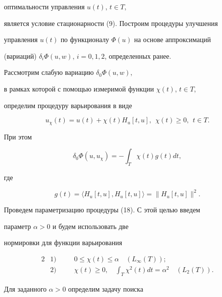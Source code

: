 оптимальности управления $u(t)$, $t\in T$,


является условие стационарности (9). Построим процедуры улучшения


управления $u(t)$ по функционалу $\Phi(u)$ на основе аппроксимаций


(вариаций) $\delta_{i}\Phi(u,w)$, $i=0, 1,2$, определенных ранее.





Рассмотрим слабую вариацию $\delta_{0}\Phi(u,w)$, 


в рамках которой с помощью измеримой функции $\chi(t)$, $t\in T$,


определим процедуру варьирования в виде


\begin{equation}


u_{\chi}(t)=u(t)+\chi(t)H_{u}[t, u],


\ \ \chi(t)\geq 0,\ \ t\in T.


\end{equation}


При этом


$$


\delta_{0}\Phi(u,u_{\chi})=- \int_{T}


\chi(t)g(t)dt,


$$


где


$$


g(t)=\langle H_{u}[t, u],H_{u}[t, u]\rangle=\|H_{u}[t, u]\|^{2}.


$$





Проведем параметризацию процедуры (18). С этой целью введем 


параметр $\alpha>0$ и будем использовать две


нормировки для функции варьирования


\begin{alignat*}{2}


&1) &\quad &0 \leq \chi(t) \leq \alpha \quad ( L_{\infty}(T));\\


&2) &\quad &\chi(t) \geq 0,\quad


\int_{T} \chi^{2}(t)dt=\alpha^{2} \quad ( L_{2}(T)).


\end{alignat*}





Для заданного $\alpha>0$ определим задачу поиска 


